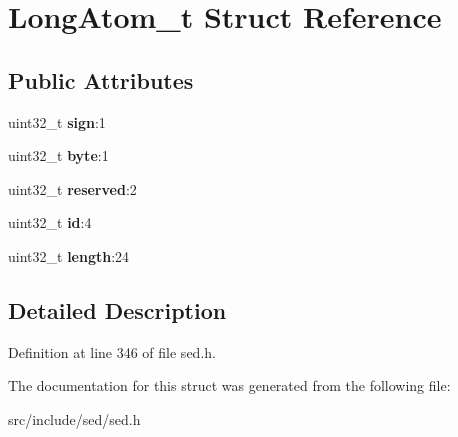 \hypertarget{structLongAtom__t}{}\section{Long\+Atom\+\_\+t Struct Reference}
\label{structLongAtom__t}
\subsection*{Public Attributes}
\begin{DoxyCompactItemize}
\item 
\hypertarget{structLongAtom__t_a40a351e5c3e5f90c35eaba4dd9454c7b}{}uint32\+\_\+t {\bfseries sign}\+:1\label{structLongAtom__t_a40a351e5c3e5f90c35eaba4dd9454c7b}

\item 
\hypertarget{structLongAtom__t_a013d29f40716b504ecbbc4dd7112073a}{}uint32\+\_\+t {\bfseries byte}\+:1\label{structLongAtom__t_a013d29f40716b504ecbbc4dd7112073a}

\item 
\hypertarget{structLongAtom__t_ae2dd27e3b8320327cc059ef774808b3c}{}uint32\+\_\+t {\bfseries reserved}\+:2\label{structLongAtom__t_ae2dd27e3b8320327cc059ef774808b3c}

\item 
\hypertarget{structLongAtom__t_acb87520bb3969fc342edd6a66bdc6417}{}uint32\+\_\+t {\bfseries id}\+:4\label{structLongAtom__t_acb87520bb3969fc342edd6a66bdc6417}

\item 
\hypertarget{structLongAtom__t_a863d130db7d9678f4e6f0b4fe04e944f}{}uint32\+\_\+t {\bfseries length}\+:24\label{structLongAtom__t_a863d130db7d9678f4e6f0b4fe04e944f}

\end{DoxyCompactItemize}


\subsection{Detailed Description}


Definition at line 346 of file sed.\+h.



The documentation for this struct was generated from the following file\+:\begin{DoxyCompactItemize}
\item 
src/include/sed/sed.\+h\end{DoxyCompactItemize}
